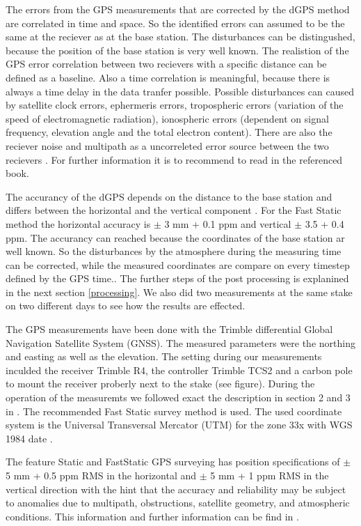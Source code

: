 The errors from the GPS measurements that are corrected by the dGPS method are correlated in time and space.
So the identified errors can assumed to be the same at the reciever as at the base station.
The disturbances can be distingushed, because the position of the base station is very well known.
The realistion of the GPS error correlation between two recievers with a specific distance can be defined as a baseline.
Also a time correlation is meaningful, because there is always a time delay in the data tranfer possible.
Possible disturbances can caused by satellite clock errors, ephermeris errors, tropospheric errors (variation of the speed of electromagnetic radiation), ionospheric errors (dependent on signal frequency, elevation angle and the total electron content). 
There are also the reciever noise and multipath as a uncorreleted error source between the two recievers \citep{UGPS}.
For further information it is to recommend to read in the referenced book.

The accurancy of the dGPS depends on the distance to the base station and differs between the horizontal and the vertical component \citep{Trquickstart}.
For the Fast Static method the horizontal accuracy is $ \pm $ 3 mm + 0.1 ppm and vertical $ \pm $ 3.5 + 0.4 ppm.
The accurancy can reached because the coordinates of the base station ar well known. 
So the disturbances by the atmosphere during the measuring time can be corrected, while the measured coordinates are compare on every timestep defined by the GPS time.. 
The further steps of the post processing is explanined in the next section 
\ref{processing}.
We also did two measurements at the same stake on two different days to see how the results are effected.
\medskip

The GPS measurements have been done with the Trimble differential Global Navigation Satellite System (GNSS). 
The measured parameters were the northing and easting as well as the elevation.
The setting during our measurements inculded the receiver Trimble R4, the controller Trimble TCS2 and a carbon pole to mount the receiver proberly next to the stake (see figure).
During the operation of the measuremts we followed exact the description in section 2 and 3 in \cite{Trquickstart}. 
The recommended Fast Static survey method is used.
The used coordinate system is the Universal Transversal Mercator (UTM) for the zone 33x with WGS 1984 date  \citep{Trquickstart}. 

The feature Static and FastStatic GPS surveying has position specifications of $ \pm $ 5 mm + 0.5 ppm RMS in the horizontal and $ \pm $ 5 mm + 1 ppm RMS in the vertical direction with the hint that the accuracy and reliability may be subject to anomalies due to multipath, obstructions, satellite geometry, and atmospheric conditions.
This information and further information can be find in \cite{Truserguide}.
\medskip

